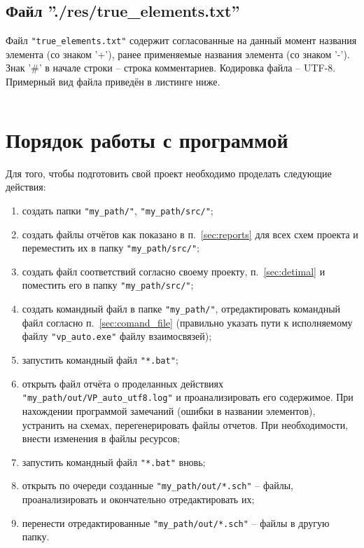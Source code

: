 \subsection{Файл ''./res/true\_elements.txt''}
Файл \verb|"true_elements.txt"| содержит согласованные на данный момент названия элемента (со знаком '+'), ранее применяемые названия элемента (со знаком '-'). Знак '\#' в начале строки -- строка комментариев. Кодировка файла -- UTF-8. Примерный вид файла приведён в листинге ниже.

\inputminted[fontsize=\small, linenos, breaklines, numbersep=2mm, xleftmargin=5mm, frame=single]{text}{./VP_auto/inc/true_elements.txt}







\section{Порядок работы с программой}

Для того, чтобы подготовить свой проект необходимо проделать следующие действия:
\begin{enumerate}
  \item создать папки \verb|"my_path/"|, \verb|"my_path/src/"|;
  \item создать файлы отчётов как показано в п.~\ref{sec:reports} для всех схем проекта и переместить их в папку \verb|"my_path/src/"|;
  \item создать файл соответствий согласно своему проекту, п.~\ref{sec:detimal} и поместить его в папку \verb|"my_path/src/"|;
  \item создать командный файл в папке \verb|"my_path/"|, отредактировать командный файл согласно п.~\ref{sec:comand_file} (правильно указать пути к исполняемому файлу \verb|"vp_auto.exe"| файлу взаимосвязей);
  \item запустить командный файл \verb|"*.bat"|;
  \item открыть файл отчёта о проделанных действиях \\ \verb|"my_path/out/VP_auto_utf8.log"| и проанализировать его содержимое. При нахождении программой замечаний (ошибки в названии элементов), устранить на схемах, перегенерировать файлы отчетов. При необходимости, внести изменения в файлы ресурсов;
  \item запустить командный файл \verb|"*.bat"| вновь;
  \item открыть по очереди созданные \verb|"my_path/out/*.sch"| -- файлы, проанализировать и окончательно отредактировать их;
  \item перенести отредактированные \verb|"my_path/out/*.sch"|  -- файлы в другую папку.
\end{enumerate}

